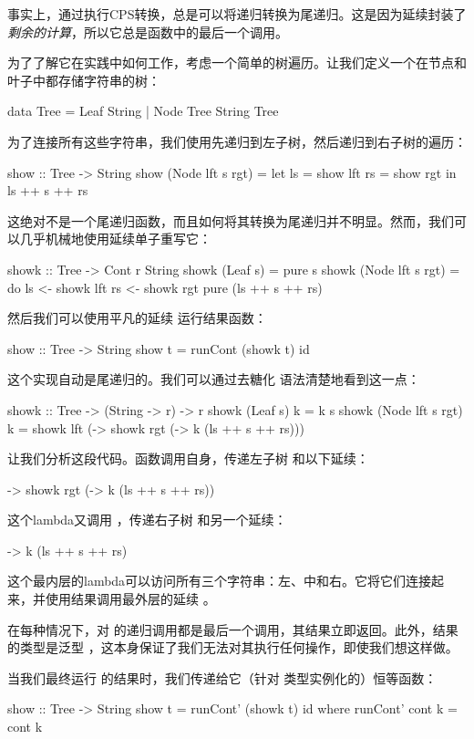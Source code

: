 \documentclass[DaoFP]{subfiles}
\begin{document}
事实上，通过执行CPS转换，总是可以将递归转换为尾递归。这是因为延续封装了\emph{剩余的计算}，所以它总是函数中的最后一个调用。

为了了解它在实践中如何工作，考虑一个简单的树遍历。让我们定义一个在节点和叶子中都存储字符串的树：
\begin{haskell}
data Tree = Leaf String 
          | Node Tree String Tree
\end{haskell}
为了连接所有这些字符串，我们使用先递归到左子树，然后递归到右子树的遍历：
\begin{haskell}
show :: Tree -> String
show (Node lft s rgt) =
  let ls = show lft
      rs = show rgt
  in ls ++ s ++ rs
\end{haskell}
这绝对不是一个尾递归函数，而且如何将其转换为尾递归并不明显。然而，我们可以几乎机械地使用延续单子重写它：
\begin{haskell}
showk :: Tree -> Cont r String
showk (Leaf s) = pure s
showk (Node lft s rgt) = do
  ls <- showk lft
  rs <- showk rgt
  pure (ls ++ s ++ rs)
 \end{haskell}
然后我们可以使用平凡的延续  运行结果函数：
\begin{haskell}
show :: Tree -> String
show t = runCont (showk t) id
\end{haskell}

这个实现自动是尾递归的。我们可以通过去糖化  语法清楚地看到这一点：
\begin{haskell}
showk :: Tree -> (String -> r) -> r
showk (Leaf s) k = k s
showk (Node lft s rgt) k =
  showk lft (\ls -> 
    showk rgt (\rs -> 
      k (ls ++ s ++ rs)))
\end{haskell}
让我们分析这段代码。函数调用自身，传递左子树  和以下延续：
\begin{haskell}
\ls -> 
    showk rgt (\rs -> 
      k (ls ++ s ++ rs))
\end{haskell}
这个lambda又调用 ，传递右子树  和另一个延续：
\begin{haskell}
\rs -> k (ls ++ s ++ rs)
\end{haskell}
这个最内层的lambda可以访问所有三个字符串：左、中和右。它将它们连接起来，并使用结果调用最外层的延续 。

在每种情况下，对  的递归调用都是最后一个调用，其结果立即返回。此外，结果的类型是泛型 ，这本身保证了我们无法对其执行任何操作，即使我们想这样做。

当我们最终运行  的结果时，我们传递给它（针对  类型实例化的）恒等函数：
\begin{haskell}
show :: Tree -> String
show t = runCont' (showk t) id
  where runCont' cont k = cont k
\end{haskell}
\end{document}
